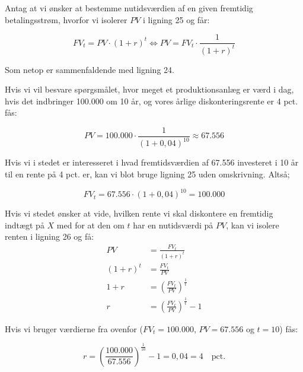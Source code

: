 \documentclass[10pt,reqno, usenames]{article}
\begin{document}
\begin{tcolorbox}[breakable, colback=red!5!white, colframe=red!50!black, title= Eksempel 1: Brug af fremtidsværdiligningen]
Antag at vi ønsker at bestemme nutidsværdien af en given fremtidig betalingsstrøm, hvorfor vi isolerer $PV$ i ligning 25 og får: 

\begin{equation}
    FV_t = PV \cdot (1+r)^t \Longleftrightarrow PV = FV_t \cdot \frac{1}{(1+r)^t}
\end{equation}

Som netop er sammenfaldende med ligning 24. 

\vspace{10 pt}

Hvis vi vil besvare spørgsmålet, hvor meget et produktionsanlæg er værd i dag, hvis det indbringer 100.000 om 10 år, og vores årlige diskonteringsrente er 4 pct. fås:

\begin{equation*}
    PV = 100.000 \cdot \frac{1}{(1+0,04)^{10}} \approx 67.556
\end{equation*}

Hvis vi i stedet er interesseret i hvad fremtidsværdien af 67.556 investeret i 10 år til en rente på 4 pct. er, kan vi blot bruge ligning 25 uden omskrivning. Altså; 

\begin{equation*}
    FV_t = 67.556 \cdot (1+0,04)^{10} = 100.000
\end{equation*}

Hvis vi stedet ønsker at vide, hvilken rente vi skal diskontere en fremtidig indtægt på $X$ med for at den om $t$ har en nutidsværdi på $PV$, kan vi isolere renten i ligning 26 og få: 
\begin{align}
PV &= \frac{FV_t}{(1 + r)^t} \nonumber \\
(1 + r)^t &= \frac{FV_t}{PV} \nonumber \\
1 + r &= \left(\frac{FV_t}{PV}\right)^{\frac{1}{t}} \nonumber \\
r &= \left(\frac{FV_t}{PV}\right)^{\frac{1}{t}} - 1
\end{align}

Hvis vi bruger værdierne fra ovenfor ($FV_t = 100.000$, $PV = 67.556$ og $t=10$) fås: 

\begin{equation*}
    r = \left(\frac{100.000}{67.556}\right)^{\frac{1}{10}} - 1 = 0,04 = 4 \quad \text{pct.}
\end{equation*}


\end{tcolorbox}
\end{document}
